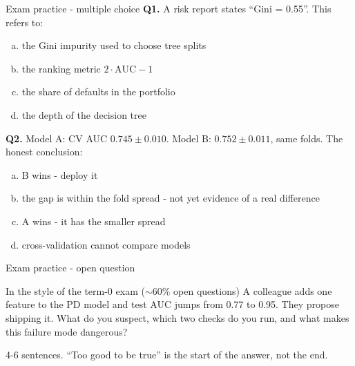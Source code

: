 \documentclass[10pt,aspectratio=169]{beamer}
\begin{document}
\begin{frame}{Exam practice - multiple choice}
  \small
  \textbf{Q1.} A risk report states ``Gini = 0.55''. This refers to:
  \begin{enumerate}[(a)]
    \item the Gini impurity used to choose tree splits
    \item the ranking metric $2\cdot\text{AUC}-1$
    \item the share of defaults in the portfolio
    \item the depth of the decision tree
  \end{enumerate}
  \vspace{0.4em}
  \textbf{Q2.} Model A: CV AUC $0.745 \pm 0.010$. Model B: $0.752 \pm 0.011$,
  same folds. The honest conclusion:
  \begin{enumerate}[(a)]
    \item B wins - deploy it
    \item the gap is within the fold spread - not yet evidence of a real difference
    \item A wins - it has the smaller spread
    \item cross-validation cannot compare models
  \end{enumerate}
\end{frame}

\begin{frame}{Exam practice - open question}
  \begin{block}{In the style of the term-0 exam ($\sim$60\% open questions)}
    A colleague adds one feature to the PD model and test AUC jumps from
    0.77 to 0.95. They propose shipping it. What do you suspect, which two
    checks do you run, and what makes this failure mode dangerous?
  \end{block}
  \vspace{0.5em}
  \begin{center}\small
    4-6 sentences. ``Too good to be true'' is the start of the answer,
    not the end.
  \end{center}
\end{frame}
\end{document}
